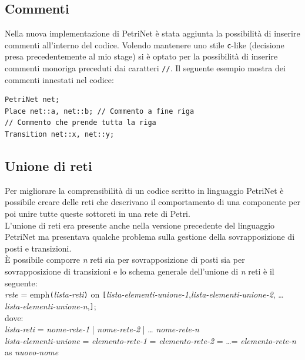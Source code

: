 \documentclass[italian,12pt]{book}
\begin{document}
\subsection{Commenti}\label{ssect:new_commenti}
Nella nuova implementazione di PetriNet è stata aggiunta la possibilità di inserire commenti all'interno del 
codice. Volendo mantenere uno stile {\tt c}-like (decisione presa precedentemente al mio stage) si è optato 
per la possibilità di inserire commenti monoriga preceduti dai caratteri {\tt //}. Il seguente esempio mostra 
dei commenti innestati nel codice:
\begin{verbatim}PetriNet net;
Place net::a, net::b; // Commento a fine riga
// Commento che prende tutta la riga
Transition net::x, net::y;
\end{verbatim}

\subsection{Unione di reti}\label{subsect:unione_di_reti}
Per migliorare la comprensibilità di un codice scritto in linguaggio PetriNet è possibile creare delle reti che descrivano il comportamento di una componente per poi unire tutte queste sottoreti in una rete di Petri.\\
L'unione di reti era presente anche nella versione precedente del linguaggio PetriNet ma presentava qualche problema sulla gestione della sovrapposizione di posti e transizioni.\\
È possibile comporre \emph{n} reti sia per sovrapposizione di posti sia per sovrapposizione di transizioni e lo schema generale dell'unione di \emph{n} reti è il seguente:\\

\emph{rete}  = emph{\tt(}\emph{lista-reti}{\tt)} on
{\tt[}\emph{lista-elementi-unione-1},\emph{lista-elementi-unione-2},
\dots \emph{lista-elementi-unione-n},{\tt]};\\

dove:\\

\emph{lista-reti} = \emph{nome-rete-1} | \emph{nome-rete-2} | \dots
\emph{nome-rete-n} \\

\emph{lista-elementi-unione} = \emph{elemento-rete-1} =
\emph{elemento-rete-2} = \dots = \emph{elemento-rete-n} as
\emph{nuovo-nome} \\
\end{document}
